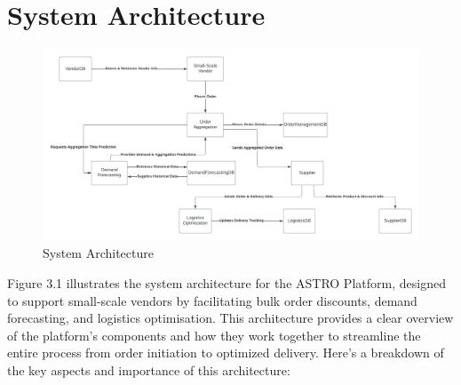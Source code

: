 
\chapter{System Architecture}


\begin{figure}[h]
    \centering
    \includegraphics[width=\textwidth]{Figures/system_archh.png}
    \caption{System Architecture}
    \label{fig:architecture}
\end{figure}

\noindent Figure 3.1 illustrates the system architecture for the ASTRO Platform, designed to support small-scale vendors by facilitating bulk order discounts, demand forecasting, and logistics optimisation. This architecture provides a clear overview of the platform’s components and how they work together to streamline the entire process from order initiation to optimized delivery. Here’s a breakdown of the key aspects and importance of this architecture:

